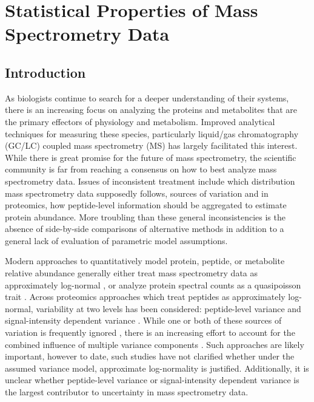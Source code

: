 \section{Statistical Properties of Mass Spectrometry Data}

\subsection{Introduction}

As biologists continue to search for a deeper understanding of their systems, there is an increasing focus on analyzing the proteins and metabolites that are the primary effectors of physiology and metabolism. Improved analytical techniques for measuring these species, particularly liquid/gas chromatography (GC/LC) coupled mass spectrometry (MS) has largely facilitated this interest. While there is great promise for the future of mass spectrometry, the scientific community is far from reaching a consensus on how to best analyze mass spectrometry data.  Issues of inconsistent treatment include which distribution mass spectrometry data supposedly follows, sources of variation and in proteomics, how peptide-level information should be aggregated to estimate protein abundance. More troubling than these general inconsistencies is the absence of side-by-side comparisons of alternative methods in addition to a general lack of evaluation of parametric model assumptions. 

Modern approaches to quantitatively model protein, peptide, or metabolite relative abundance generally either treat mass spectrometry data as approximately log-normal \cite{Cox:2008ir, Oberg:2012bm,Navarro:2014ke, Breunig:2014bu}, or analyze protein spectral counts as a quasipoisson trait \cite{Li:2010bj}. Across proteomics approaches which treat peptides as approximately log-normal, variability at two levels has been considered: peptide-level variance \cite{Navarro:2014ke} and signal-intensity dependent variance \cite{Zhu:2011jr,Oberg:2012bm,Navarro:2014ke}. While one or both of these sources of variation is frequently ignored \cite{Oberg:2012bm}, there is an increasing effort to account for the combined influence of multiple variance components \cite{Navarro:2014ke}. Such approaches are likely important, however to date, such studies have not clarified whether under the assumed variance model, approximate log-normality is justified. Additionally, it is unclear whether peptide-level variance or signal-intensity dependent variance is the largest contributor to uncertainty in mass spectrometry data.

